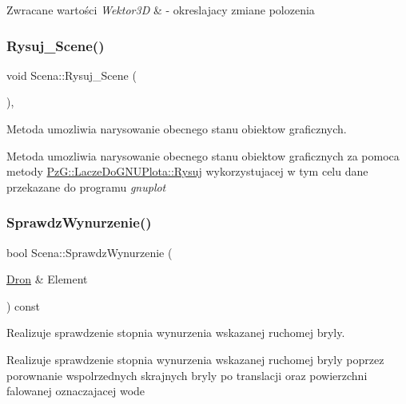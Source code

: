 \begin{DoxyRetVals}{Zwracane wartości}
{\em Wektor3D} & -\/ okreslajacy zmiane polozenia \\
\hline
\end{DoxyRetVals}
\mbox{\label{classScena_afa809376ae94fea3e939b9e354f882d3}} 
\subsubsection{\texorpdfstring{Rysuj\+\_\+\+Scene()}{Rysuj\_Scene()}}
{\footnotesize\ttfamily void Scena\+::\+Rysuj\+\_\+\+Scene (\begin{DoxyParamCaption}{ }\end{DoxyParamCaption})\hspace{0.3cm}{\ttfamily [inline]}, {\ttfamily [private]}}



Metoda umozliwia narysowanie obecnego stanu obiektow graficznych. 

Metoda umozliwia narysowanie obecnego stanu obiektow graficznych za pomoca metody \hyperlink{classPzG_1_1LaczeDoGNUPlota_a065f5b8402737cc62b0ad4f66d028335}{Pz\+G\+::\+Lacze\+Do\+G\+N\+U\+Plota\+::\+Rysuj} wykorzystujacej w tym celu dane przekazane do programu {\itshape gnuplot} \mbox{\label{classScena_ad718f45ba059441502ae63688acb43ba}} 
\subsubsection{\texorpdfstring{Sprawdz\+Wynurzenie()}{SprawdzWynurzenie()}}
{\footnotesize\ttfamily bool Scena\+::\+Sprawdz\+Wynurzenie (\begin{DoxyParamCaption}\item[{\hyperlink{classDron}{Dron} \&}]{Element }\end{DoxyParamCaption}) const\hspace{0.3cm}{\ttfamily [private]}}



Realizuje sprawdzenie stopnia wynurzenia wskazanej ruchomej bryly. 

Realizuje sprawdzenie stopnia wynurzenia wskazanej ruchomej bryly poprzez porownanie wspolrzednych skrajnych bryly po translacji oraz powierzchni falowanej oznaczajacej wode

